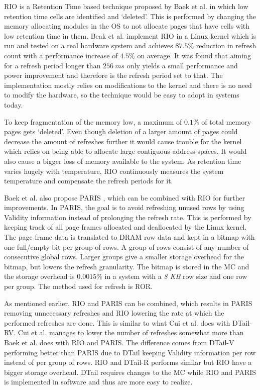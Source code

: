 RIO is a Retention Time based technique proposed by Baek et al. \cite{rioparis} in which low retention time cells are identified and `deleted'. This is performed by changing the memory allocating modules in the OS to not allocate pages that have cells with low retention time in them. Beak et al. implement RIO in a Linux kernel which is run and tested on a real hardware system and achieves $87.5\%$ reduction in refresh count with a performance increase of $4.5\%$ on average. It was found that aiming for a refresh period longer than $256~ms$ only yields a small performance and power improvement and therefore is the refresh period set to that. The implementation mostly relies on modifications to the kernel and there is no need to modify the hardware, so the technique would be easy to adopt in systems today. 

To keep fragmentation of the memory low, a maximum of $0.1\%$ of total memory pages gets `deleted'. Even though deletion of a larger amount of pages could decrease the amount of refreshes further it would cause trouble for the kernel which relies on being able to allocate large contiguous address spaces. It would also cause a bigger loss of memory available to the system. As retention time varies hugely with temperature, RIO continuously measures the system temperature and compensate the refresh periods for it. 

Baek et al. also propose PARIS \cite{rioparis}, which can be combined with RIO for further improvements. In PARIS, the goal is to avoid refreshing unused rows by using Validity information instead of prolonging the refresh rate. This is performed by keeping track of all page frames allocated and deallocated by the Linux kernel. The page frame data is translated to DRAM row data and kept in a bitmap with one full/empty bit per group of rows. A group of rows consist of any number of consecutive global rows. Larger groups give a smaller storage overhead for the bitmap, but lowers the refresh granularity. The bitmap is stored in the MC and the storage overhead is $0.0015\%$ in a system with a \textit{8 KB} row size and one row per group. The method used for refresh is ROR. 

As mentioned earlier, RIO and PARIS can be combined, which results in PARIS removing unnecessary refreshes and RIO lowering the rate at which the performed refreshes are done. This is similar to what Cui et al. does with DTail-RV. Cui et al. manages to lower the number of refreshes somewhat more than Baek et al. does with RIO and PARIS. The difference comes from DTail-V performing better than PARIS due to DTail keeping Validity information per row instead of per group of rows. RIO and DTail-R performs similar but RIO have a bigger storage overhead. DTail requires changes to the MC while RIO and PARIS is implemented in software and thus are more easy to realize. 
